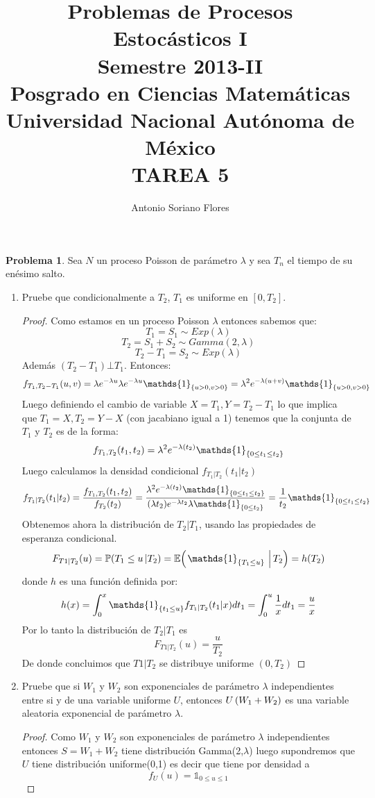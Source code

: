 \documentclass[a5paper,oneside]{amsart}
\title[Problemas de Procesos I]{Problemas de Procesos Estoc\'asticos I\\ Semestre 2013-II\\ Posgrado en Ciencias Matem\'aticas\\ Universidad Nacional Aut\'onoma de M\'exico\\TAREA 5}
\author{Antonio Soriano Flores}
\theoremstyle{plain}
\theoremstyle{definition}
\newtheorem{problema}{Problema}
\begin{document}
\maketitle
\begin{problema}
Sea $N$ un proceso Poisson de par\'ametro $\lambda$ y sea $T_n$ el tiempo de su en\'esimo salto. 
\begin{enumerate}
\item Pruebe que condicionalmente a $T_2$, $T_1$ es uniforme en $[0,T_2]$.
\begin{proof}
Como estamos en un proceso Poisson $\lambda$ entonces sabemos que:
 $$T_1=S_1 \sim Exp(\lambda)$$ 
 $$T_2=S_1+S_2 \sim Gamma(2,\lambda)$$
 $$T_2-T_1  =S_2 \sim Exp(\lambda)$$
 Adem\'as  $(T_2-T_1) \bot T_1$. Entonces:
 $$
 f_{T_1,T_2-T_1}(u,v)=\lambda e^{-\lambda u}\lambda e^{-\lambda u}\mathds{1}_{\set{u>0,v>0}}=\lambda^2e^{-\lambda(u+v)}\mathds{1}_{\set{u>0,v>0}}
 $$
 Luego definiendo el cambio de variable $X=T_1, Y=T_2-T_1$ lo que implica que $T_1=X,T_2=Y-X$ (con jacabiano igual a 1)  tenemos que la conjunta de $T_1$ y  $T_2$ es de la forma:
 $$
  f_{T_1,T_2}(t_1,t_2)=\lambda^2e^{-\lambda(t_2)}\mathds{1}_{\set{0 \leq t_1 \leq t_2}}
 $$ 
 Luego calculamos la densidad condicional $f_{T_1|T_2}(t_1|t_2)$ 
 $$
 f_{T_1|T_2}(t_1|t_2)=\frac{f_{T_1,T_2}(t_1,t_2)}{f_{T_2}(t_2)}=\frac{\lambda^2e^{-\lambda(t_2)} \mathds{1}_{\set{0 \leq t_1 \leq t_2}}}{(\lambda t_2)e^{-\lambda t_2}\lambda\mathds{1}_{\set{0 \leq t_2}}}=\frac{1}{t_2}\mathds{1}_{\set{0 \leq t_1  \leq t_2}}
 $$
 Obtenemos ahora la distribuci\'on de $T_2|T_1$, usando las propiedades de esperanza condicional.
 $$
 F_{T1|T_2}(u)=\probac{T_1\leq u}{T_2}=\espc{\mathds{1}_{\set{T_1 \leq u}}}{T_2}=h(T_2)
 $$
 donde $h$ es una funci\'on definida por:
 $$
 h(x)=\int_{0}^{x}\mathds{1}_{\set{t_1 \leq u}} f_{T_1|T_2}(t_1|x) dt_1=\int_{0}^{u}\frac{1}{x}dt_1=\frac{u}{x}
 $$
 Por lo tanto la distribuci\'on de $T_2|T_1$ es
 $$
F_{T1|T_2}(u)=\frac{u}{T_2}
 $$
 De donde concluimos que $T1|T_2$ se distribuye uniforme $(0,T_2)$
 \end{proof} 
\item Pruebe que si $W_1$ y $W_2$  son  exponenciales de par\'ametro $\lambda$  independientes entre si y de una variable uniforme $U$, entonces $U\left( W_1+W_2\right) $ es una variable aleatoria exponencial de par\'ametro $\lambda$. 
\begin{proof}
Como $W_1$ y $W_2$  son  exponenciales de par\'ametro $\lambda$  independientes entonces $S=W_1+W_2$ tiene distribuci\'on Gamma(2,$\lambda$) luego supondremos que $U$ tiene distribuci\'on uniforme(0,1) es decir que tiene por densidad a $$f_U(u)=\mathds{1}_{0\leq u \leq 1 }$$

\end{proof}
\end{enumerate}
\end{problema}
\end{document}
